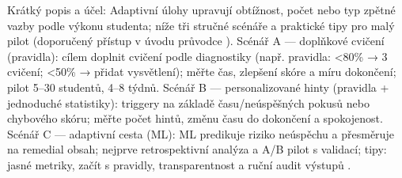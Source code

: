 Krátký popis a účel: Adaptivní úlohy upravují obtížnost, počet nebo typ zpětné vazby podle výkonu studenta; níže tři stručné scénáře a praktické tipy pro malý pilot (doporučený přístup v úvodu průvodce \cite{1}).  
Scénář A — doplňkové cvičení (pravidla): cílem doplnit cvičení podle diagnostiky (např. pravidla: <80\% → 3 cvičení; <50\% → přidat vysvětlení); měřte čas, zlepšení skóre a míru dokončení; pilot 5--30 studentů, 4--8 týdnů.  
Scénář B — personalizované hinty (pravidla + jednoduché statistiky): triggery na základě času/neúspěšných pokusů nebo chybového skóru; měřte počet hintů, změnu času do dokončení a spokojenost.  
Scénář C — adaptivní cesta (ML): ML predikuje riziko neúspěchu a přesměruje na remedial obsah; nejprve retrospektivní analýza a A/B pilot s validací; tipy: jasné metriky, začít s pravidly, transparentnost a ruční audit výstupů \cite{1}.
